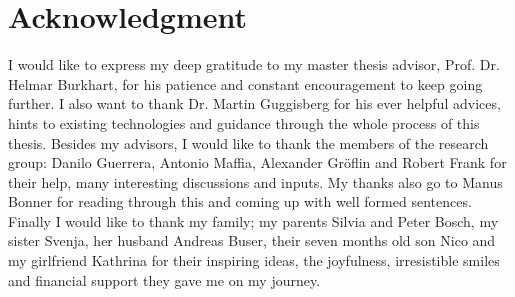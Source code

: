\chapter*{Acknowledgment}
I would like to express my deep gratitude to my master thesis advisor, Prof. Dr. Helmar Burkhart, for his patience and constant encouragement to keep going further.
I also want to thank Dr. Martin Guggisberg for his ever helpful advices, hints to existing technologies and guidance through the whole process of this thesis.
Besides my advisors, I would like to thank the members of the research group: Danilo Guerrera,
Antonio Maffia, Alexander Gr\"oflin and Robert Frank for their help, many interesting discussions and inputs.
My thanks also go to Manus Bonner for reading through this and coming up with well formed sentences.
Finally I would like to thank my family; my parents Silvia and Peter Bosch, my sister Svenja, her husband Andreas Buser, their seven months old son Nico and my girlfriend Kathrina for their inspiring ideas, the joyfulness, irresistible smiles and financial support they gave me on my journey.